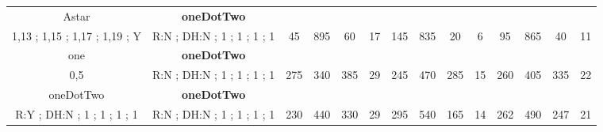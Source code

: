 \begin{table}[H]
{\begin{tabular}{|c|c|c|c|c|c|c|c|c|c|c|c|c|c|}
Astar & \cellcolor{blue!15}\textbf{oneDotTwo}& {\color[HTML]{00009B} } & {\color[HTML]{9A0000} } & {\color[HTML]{009901} } &  & {\color[HTML]{00009B} } & {\color[HTML]{9A0000} } & {\color[HTML]{009901} } &  & {\color[HTML]{00009B} } & {\color[HTML]{9A0000} } & {\color[HTML]{009901} } &  \\ 
1,13 ; 1,15 ; 1,17 ; 1,19 ; Y & \cellcolor{ blue!15}R:N ; DH:N ; 1 ; 1 ; 1 ; 1 & \multirow{-2}{*}{{\color[HTML]{00009B} 45}} & \multirow{-2}{*}{{\color[HTML]{9A0000} 895}} & \multirow{-2}{*}{{\color[HTML]{009901} 60}} & \multirow{-2}{*}{17} & \multirow{-2}{*}{{\color[HTML]{00009B} 145}} & \multirow{-2}{*}{{\color[HTML]{9A0000} 835}} & \multirow{-2}{*}{{\color[HTML]{009901} 20}} & \multirow{-2}{*}{6} & \multirow{-2}{*}{{\color[HTML]{00009B} 95}} & \multirow{-2}{*}{{\color[HTML]{9A0000} 865}} & \multirow{-2}{*}{{\color[HTML]{009901} 40}} & \multirow{-2}{*}{11} \\ \hline

one & \cellcolor{blue!15}\textbf{oneDotTwo}& {\color[HTML]{00009B} } & {\color[HTML]{9A0000} } & {\color[HTML]{009901} } &  & {\color[HTML]{00009B} } & {\color[HTML]{9A0000} } & {\color[HTML]{009901} } &  & {\color[HTML]{00009B} } & {\color[HTML]{9A0000} } & {\color[HTML]{009901} } &  \\ 
0,5 & \cellcolor{ blue!15}R:N ; DH:N ; 1 ; 1 ; 1 ; 1 & \multirow{-2}{*}{{\color[HTML]{00009B} 275}} & \multirow{-2}{*}{{\color[HTML]{9A0000} 340}} & \multirow{-2}{*}{{\color[HTML]{009901} 385}} & \multirow{-2}{*}{29} & \multirow{-2}{*}{{\color[HTML]{00009B} 245}} & \multirow{-2}{*}{{\color[HTML]{9A0000} 470}} & \multirow{-2}{*}{{\color[HTML]{009901} 285}} & \multirow{-2}{*}{15} & \multirow{-2}{*}{{\color[HTML]{00009B} 260}} & \multirow{-2}{*}{{\color[HTML]{9A0000} 405}} & \multirow{-2}{*}{{\color[HTML]{009901} 335}} & \multirow{-2}{*}{22} \\ \hline

oneDotTwo & \cellcolor{blue!15}\textbf{oneDotTwo}& {\color[HTML]{00009B} } & {\color[HTML]{9A0000} } & {\color[HTML]{009901} } &  & {\color[HTML]{00009B} } & {\color[HTML]{9A0000} } & {\color[HTML]{009901} } &  & {\color[HTML]{00009B} } & {\color[HTML]{9A0000} } & {\color[HTML]{009901} } &  \\ 
R:Y ; DH:N ; 1 ; 1 ; 1 ; 1 & \cellcolor{ blue!15}R:N ; DH:N ; 1 ; 1 ; 1 ; 1 & \multirow{-2}{*}{{\color[HTML]{00009B} 230}} & \multirow{-2}{*}{{\color[HTML]{9A0000} 440}} & \multirow{-2}{*}{{\color[HTML]{009901} 330}} & \multirow{-2}{*}{29} & \multirow{-2}{*}{{\color[HTML]{00009B} 295}} & \multirow{-2}{*}{{\color[HTML]{9A0000} 540}} & \multirow{-2}{*}{{\color[HTML]{009901} 165}} & \multirow{-2}{*}{14} & \multirow{-2}{*}{{\color[HTML]{00009B} 262}} & \multirow{-2}{*}{{\color[HTML]{9A0000} 490}} & \multirow{-2}{*}{{\color[HTML]{009901} 247}} & \multirow{-2}{*}{21} \\ \hline


\end{tabular}}
\end{table}
